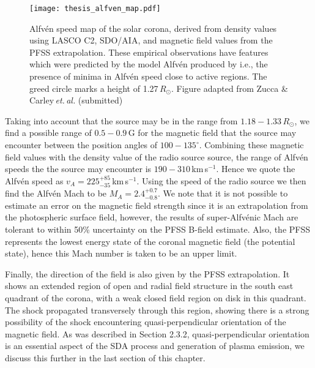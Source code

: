 %
%
%
\begin{figure}[t!]
\begin{center}
\texttt{[image: thesis\_alfven\_map.pdf]}
\caption[Alfv\'{e}n speed map of the solar corona.]{Alfv\'{e}n speed map of the solar corona, derived from density values using LASCO C2, SDO/AIA, and magnetic field values from the PFSS extrapolation. These empirical observations have features which were predicted by the model Alfv\'{e}n produced by \citet{warmuth2005} i.e., the presence of minima in Alfv\'{e}n speed close to active regions. The greed circle marks a height of 1.27\,$R_{\odot}$. Figure adapted from Zucca \& Carley\,{\it et.\,al.} (submitted)}
\label{fig:alfven_map}
\end{center}
\end{figure}
%
%
%
Taking into account that the source may be in the range from $1.18-1.33\,R_{\odot}$, we find a possible range of $0.5-0.9$\,G for the magnetic field that the source may encounter between the position angles of $100-135^{\circ}$. Combining these magnetic field values with the density value of the radio source source, the range of Alfv\'{e}n speeds the the source may encounter is $190-310$\,km\,s$^{-1}$. Hence we quote the Alfv\'{e}n speed as $v_A=225^{+85}_{-35}$\,km\,s$^{-1}$. Using the speed of the radio source we then find the Alfv\'{e}n Mach to be $M_A =2.4^{+0.7}_{-0.8}$. We note that it is not possible to estimate an error on the magnetic field strength since it is an extrapolation from the photospheric surface field, however, the results of super-Alfv\'{e}nic Mach are tolerant to within 50\% uncertainty on the PFSS B-field estimate. Also, the PFSS represents the lowest energy state of the coronal magnetic field (the potential state), hence this Mach number is taken to be an upper limit.

Finally, the direction of the field is also given by the PFSS extrapolation. It shows an extended region of open and radial field structure in the south east quadrant of the corona, with a weak closed field region on disk in this quadrant. The shock propagated transversely through this region, showing there is a strong possibility of the shock encountering quasi-perpendicular orientation of the magnetic field. As was described in Section 2.3.2, quasi-perpendicular orientation is an essential aspect of the SDA process and generation of plasma emission, we discuss this further in the last section of this chapter.


